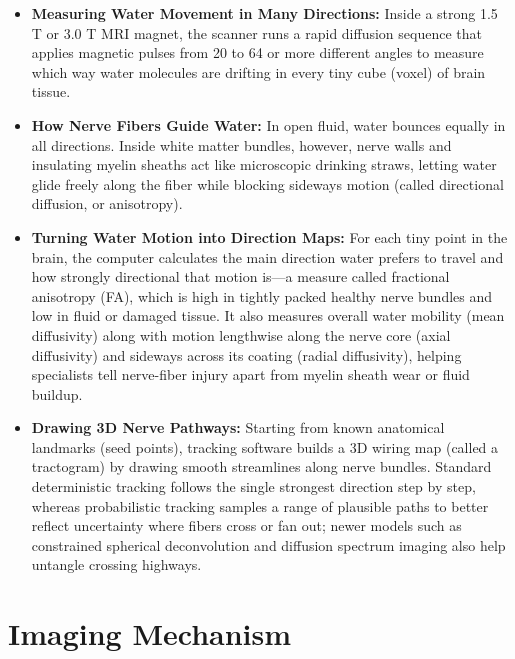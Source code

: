 \begin{itemize}
    \item \textbf{Measuring Water Movement in Many Directions:} Inside a strong 1.5 T or 3.0 T MRI magnet, the scanner runs a rapid diffusion sequence that applies magnetic pulses from 20 to 64 or more different angles to measure which way water molecules are drifting in every tiny cube (voxel) of brain tissue.
    \item \textbf{How Nerve Fibers Guide Water:} In open fluid, water bounces equally in all directions. Inside white matter bundles, however, nerve walls and insulating myelin sheaths act like microscopic drinking straws, letting water glide freely along the fiber while blocking sideways motion (called directional diffusion, or anisotropy).
    \item \textbf{Turning Water Motion into Direction Maps:} For each tiny point in the brain, the computer calculates the main direction water prefers to travel and how strongly directional that motion is---a measure called fractional anisotropy (FA), which is high in tightly packed healthy nerve bundles and low in fluid or damaged tissue. It also measures overall water mobility (mean diffusivity) along with motion lengthwise along the nerve core (axial diffusivity) and sideways across its coating (radial diffusivity), helping specialists tell nerve-fiber injury apart from myelin sheath wear or fluid buildup.
    \item \textbf{Drawing 3D Nerve Pathways:} Starting from known anatomical landmarks (seed points), tracking software builds a 3D wiring map (called a tractogram) by drawing smooth streamlines along nerve bundles. Standard deterministic tracking follows the single strongest direction step by step, whereas probabilistic tracking samples a range of plausible paths to better reflect uncertainty where fibers cross or fan out; newer models such as constrained spherical deconvolution and diffusion spectrum imaging also help untangle crossing highways.
\end{itemize}

\section{Imaging Mechanism}

